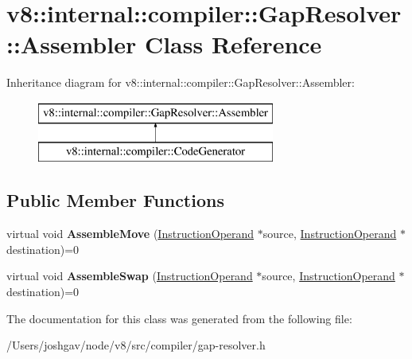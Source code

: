 \hypertarget{classv8_1_1internal_1_1compiler_1_1_gap_resolver_1_1_assembler}{}\section{v8\+:\+:internal\+:\+:compiler\+:\+:Gap\+Resolver\+:\+:Assembler Class Reference}
\label{classv8_1_1internal_1_1compiler_1_1_gap_resolver_1_1_assembler}
Inheritance diagram for v8\+:\+:internal\+:\+:compiler\+:\+:Gap\+Resolver\+:\+:Assembler\+:\begin{figure}[H]
\begin{center}
\leavevmode
\includegraphics[height=2.000000cm]{classv8_1_1internal_1_1compiler_1_1_gap_resolver_1_1_assembler}
\end{center}
\end{figure}
\subsection*{Public Member Functions}
\begin{DoxyCompactItemize}
\item 
virtual void {\bfseries Assemble\+Move} (\hyperlink{classv8_1_1internal_1_1compiler_1_1_instruction_operand}{Instruction\+Operand} $\ast$source, \hyperlink{classv8_1_1internal_1_1compiler_1_1_instruction_operand}{Instruction\+Operand} $\ast$destination)=0\hypertarget{classv8_1_1internal_1_1compiler_1_1_gap_resolver_1_1_assembler_a6a0e6dc1f86df92f38d770fa454cce9a}{}\label{classv8_1_1internal_1_1compiler_1_1_gap_resolver_1_1_assembler_a6a0e6dc1f86df92f38d770fa454cce9a}

\item 
virtual void {\bfseries Assemble\+Swap} (\hyperlink{classv8_1_1internal_1_1compiler_1_1_instruction_operand}{Instruction\+Operand} $\ast$source, \hyperlink{classv8_1_1internal_1_1compiler_1_1_instruction_operand}{Instruction\+Operand} $\ast$destination)=0\hypertarget{classv8_1_1internal_1_1compiler_1_1_gap_resolver_1_1_assembler_aa4de0477b384c6559df4c875323ae3ee}{}\label{classv8_1_1internal_1_1compiler_1_1_gap_resolver_1_1_assembler_aa4de0477b384c6559df4c875323ae3ee}

\end{DoxyCompactItemize}


The documentation for this class was generated from the following file\+:\begin{DoxyCompactItemize}
\item 
/\+Users/joshgav/node/v8/src/compiler/gap-\/resolver.\+h\end{DoxyCompactItemize}
